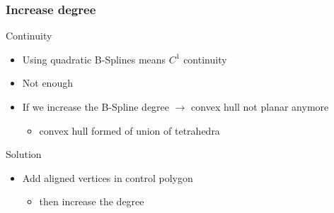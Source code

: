 \begin{frame}
  \frametitle{Increase degree}
  \begin{block}{Continuity}
    \begin{itemize}
    \item Using \alert{quadratic} B-Splines means \alert{$C^1$} continuity\pause
    \item[\xmark] Not enough
    \end{itemize}
  \end{block}\pause
  \begin{itemize}
  \item[\xmark] If we \alert{increase} the B-Spline degree \alert{$\rightarrow$} convex hull not
    \alert{planar} anymore\pause
    \begin{itemize}
    \item convex hull formed of union of \alert{tetrahedra}\pause
    \end{itemize}
  \end{itemize}
  \begin{block}{Solution}
    \begin{itemize}
    \item \alert{Add} aligned vertices in control polygon\pause
      \begin{itemize}
      \item then \alert{increase} the degree
      \end{itemize}
    \end{itemize}
  \end{block}
\end{frame}

